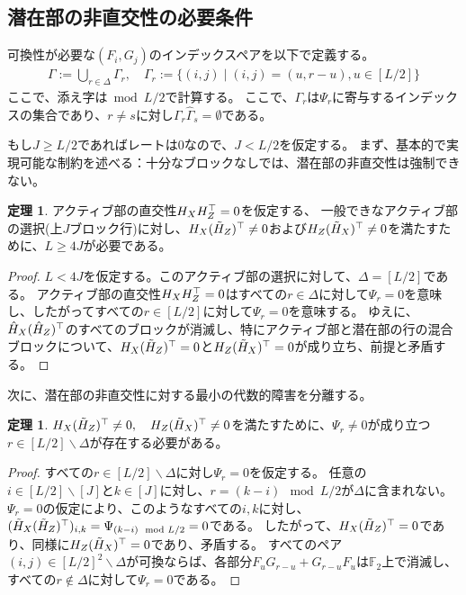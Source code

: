 \documentclass[a4paper,11pt,dvipdfmx]{jsarticle}
\theoremstyle{definition}
\newtheorem{theorem}[definition]{定理}
\begin{document}
\subsection{潜在部の非直交性の必要条件}
可換性が必要な$(F_i,G_j)$のインデックスペアを以下で定義する。
\begin{align}
  \Gamma := \bigcup_{r\in\Delta} \Gamma_r,\quad \Gamma_r := \{(i,j)\mid(i,j)=(u,r-u), u\in[L/2]\}
\end{align}
ここで、添え字は$\bmod L/2$で計算する。
ここで、$\Gamma_r$は$\Psi_r$に寄与するインデックスの集合であり、$r\neq s$に対し$\Gamma_r\hat\Gamma_s = \emptyset$である。

もし$J\geq L/2$であればレートは0なので、$J<L/2$を仮定する。
まず、基本的で実現可能な制約を述べる：十分なブロックなしでは、潜在部の非直交性は強制できない。
\begin{theorem}
  アクティブ部の直交性$H_XH_Z^\top=0$を仮定する、
  一般できなアクティブ部の選択(上$J$ブロック行)に対し、$H_X(\tilde{H}_Z)^\top \neq 0$および$H_Z(\tilde{H}_X)^\top \neq 0$を満たすために、$L\geq 4J$が必要である。
\end{theorem}
\begin{proof}
  $L<4J$を仮定する。このアクティブ部の選択に対して、$\Delta = [L/2]$である。
  アクティブ部の直交性$H_XH_Z^\top=0$はすべての$r\in\Delta$に対して$\Psi_r=0$を意味し、したがってすべての$r\in[L/2]$に対して$\Psi_r=0$を意味する。
  ゆえに、$\hat{H}_X(\hat{H}_Z)^\top$のすべてのブロックが消滅し、特にアクティブ部と潜在部の行の混合ブロックについて、$H_X(\tilde{H}_Z)^\top=0$と$H_Z(\tilde{H}_X)^\top=0$が成り立ち、前提と矛盾する。
\end{proof}
次に、潜在部の非直交性に対する最小の代数的障害を分離する。

\begin{theorem}
  $H_X(\tilde{H}_Z)^\top \neq 0,\quad H_Z(\tilde{H}_X)^\top \neq 0$を満たすために、$\Psi_r \neq 0$が成り立つ$r\in[L/2]\backslash\Delta$が存在する必要がある。
\end{theorem}
\begin{proof}
  すべての$r\in[L/2]\backslash\Delta$に対し$\Psi_r=0$を仮定する。
  任意の$i\in[L/2]\backslash[J]$と$k\in[J]$に対し、$r=(k-i)\mod L/2$が$\Delta$に含まれない。
  $\Psi_r=0$の仮定により、このようなすべての$i,k$に対し、$(\tilde{H}_X(\tilde{H}_Z)^\top)_{i,k}=\Psi_{(k-i)\mod L/2}=0$である。
  したがって、$H_X(\tilde{H}_Z)^\top = 0$であり、同様に$H_Z(\tilde{H}_X)^\top = 0$であり、矛盾する。
  すべてのペア$(i,j)\in[L/2]^2\backslash\Delta$が可換ならば、各部分$F_uG_{r-u}+G_{r-u}F_u$は$\mathbb{F}_2$上で消滅し、すべての$r\not\in \Delta$に対して$\Psi_r=0$である。
\end{proof}
\end{document}
